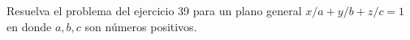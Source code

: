 \item Resuelva el problema del ejercicio 39 para un plano general $x/a + y/b + z/c = 1$ en donde $a, b, c$ son números positivos.
